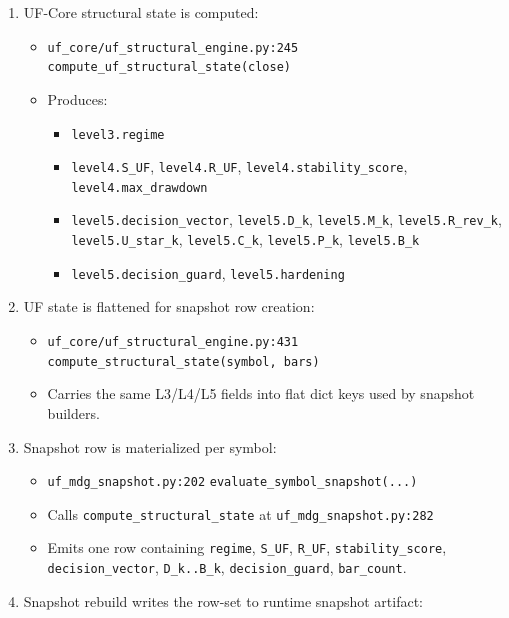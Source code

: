 \documentclass[
]{article}
\providecommand{\tightlist}{%
  \setlength{\itemsep}{0pt}\setlength{\parskip}{0pt}}
\begin{document}
\begin{enumerate}
\def\labelenumi{\arabic{enumi}.}
\item
  UF-Core structural state is computed:

  \begin{itemize}
  \tightlist
  \item
    \texttt{uf\_core/uf\_structural\_engine.py:245}
    \texttt{compute\_uf\_structural\_state(close)}
  \item
    Produces:

    \begin{itemize}
    \tightlist
    \item
      \texttt{level3.regime}
    \item
      \texttt{level4.S\_UF}, \texttt{level4.R\_UF},
      \texttt{level4.stability\_score}, \texttt{level4.max\_drawdown}
    \item
      \texttt{level5.decision\_vector}, \texttt{level5.D\_k},
      \texttt{level5.M\_k}, \texttt{level5.R\_rev\_k},
      \texttt{level5.U\_star\_k}, \texttt{level5.C\_k},
      \texttt{level5.P\_k}, \texttt{level5.B\_k}
    \item
      \texttt{level5.decision\_guard}, \texttt{level5.hardening}
    \end{itemize}
  \end{itemize}
\item
  UF state is flattened for snapshot row creation:

  \begin{itemize}
  \tightlist
  \item
    \texttt{uf\_core/uf\_structural\_engine.py:431}
    \texttt{compute\_structural\_state(symbol,\ bars)}
  \item
    Carries the same L3/L4/L5 fields into flat dict keys used by
    snapshot builders.
  \end{itemize}
\item
  Snapshot row is materialized per symbol:

  \begin{itemize}
  \tightlist
  \item
    \texttt{uf\_mdg\_snapshot.py:202}
    \texttt{evaluate\_symbol\_snapshot(...)}
  \item
    Calls \texttt{compute\_structural\_state} at
    \texttt{uf\_mdg\_snapshot.py:282}
  \item
    Emits one row containing \texttt{regime}, \texttt{S\_UF},
    \texttt{R\_UF}, \texttt{stability\_score},
    \texttt{decision\_vector}, \texttt{D\_k..B\_k},
    \texttt{decision\_guard}, \texttt{bar\_count}.
  \end{itemize}
\item
  Snapshot rebuild writes the row-set to runtime snapshot artifact:


\end{enumerate}
\end{document}
